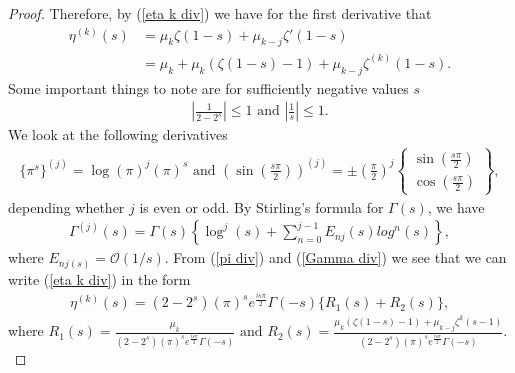 \documentclass{amsart}
\theoremstyle{plain}
\theoremstyle{definition}
\begin{document}
\begin{proof}
%
Therefore, by (\ref{eta k div}) we have for the first derivative that 
\begin{align*}
    \eta^{(k)}(s) &= \mu_k\zeta(1-s)+\mu_{k-j}\zeta'(1-s)\\
    &=\mu_k+\mu_k(\zeta(1-s)-1)+\mu_{k-j}\zeta^{(k)}(1-s).
\end{align*}
Some important things to note are for sufficiently negative values $s$
\begin{align*}
    \left|\frac{1}{2-2^s}\right|\leq 1 \text{ and } 
    \left|\frac{1}{s}\right|\leq 1.
\end{align*}
We look at the following derivatives
\begin{align}\label{pi div}
    \{\pi^s\}^{(j)} = \log(\pi)^j(\pi)^s
\text{ and }
    \left(\sin\left(\frac{s\pi}{2}\right)\right)^{(j)}=\pm \left(\frac{\pi}{2}\right)^{j}\left\{\substack{\sin(\frac{s\pi}{2})\\\cos(\frac{s\pi}{2})} \right\},
\end{align}
depending whether $j$ is even or odd. By Stirling's formula for $\Gamma(s)$, we have 
\begin{align}\label{Gamma div}
    \Gamma^{(j)}(s) = \Gamma(s)\left\{\log^j(s)+\sum_{n=0}^{j-1}E_{nj}(s)log^n(s)\right\},
\end{align}
where $E_{nj(s)}=\mathcal{O}(1/s)$. From (\ref{pi div}) and (\ref{Gamma div}) we see that we can write (\ref{eta k div}) in the form
\begin{align}\label{eta k R12 div}
    \eta^{(k)}(s) = (2-2^{s})(\pi)^se^{\frac{is\pi}{2}}\Gamma(-s)\{R_1(s)+R_2(s)\},
\end{align}
where 
$\textstyle
    R_1(s) = \frac{\mu_{k}}{(2-2^{s})(\pi)^se^{\frac{is\pi}{2}}\Gamma(-s)}
\text{ and }
    R_2(s) =\frac{\mu_k(\zeta(1-s)-1)+\mu_{k-j}\zeta^{k}(s-1)}{(2-2^{s})(\pi)^se^{\frac{is\pi}{2}}\Gamma(-s)}
.$


\end{proof}
\end{document}

